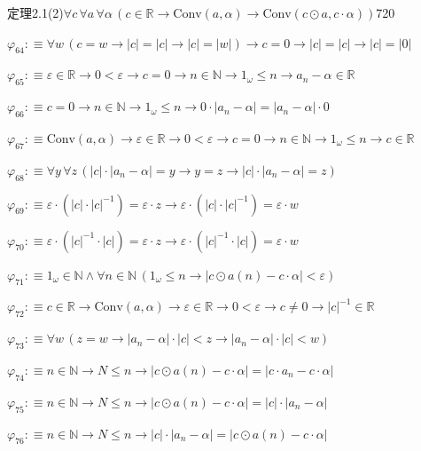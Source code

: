 \begin{fullproof}{定理2.1(2)}{$\forall c\,\forall a\,\forall \alpha\,(c \in \mathbb{R} \to \mathrm{Conv}(a,\alpha) \to \mathrm{Conv}(c \odot a,c \cdot \alpha))$}{720}
\begin{abbrevlist}
\item $\varphi_{64} :\equiv \forall w\,(c = w \to \lvert c \rvert = \lvert c \rvert \to \lvert c \rvert = \lvert w \rvert) \to c = 0 \to \lvert c \rvert = \lvert c \rvert \to \lvert c \rvert = \lvert 0 \rvert$
\item $\varphi_{65} :\equiv \varepsilon \in \mathbb{R} \to 0 < \varepsilon \to c = 0 \to n \in \mathbb{N} \to 1_{\omega} \leq n \to a_{n} - \alpha \in \mathbb{R}$
\item $\varphi_{66} :\equiv c = 0 \to n \in \mathbb{N} \to 1_{\omega} \leq n \to 0 \cdot \lvert a_{n} - \alpha \rvert = \lvert a_{n} - \alpha \rvert \cdot 0$
\item $\varphi_{67} :\equiv \mathrm{Conv}(a,\alpha) \to \varepsilon \in \mathbb{R} \to 0 < \varepsilon \to c = 0 \to n \in \mathbb{N} \to 1_{\omega} \leq n \to c \in \mathbb{R}$
\item $\varphi_{68} :\equiv \forall y\,\forall z\,(\lvert c \rvert \cdot \lvert a_{n} - \alpha \rvert = y \to y = z \to \lvert c \rvert \cdot \lvert a_{n} - \alpha \rvert = z)$
\item $\varphi_{69} :\equiv \varepsilon \cdot (\lvert c \rvert \cdot \lvert c \rvert^{-1}) = \varepsilon \cdot z \to \varepsilon \cdot (\lvert c \rvert \cdot \lvert c \rvert^{-1}) = \varepsilon \cdot w$
\item $\varphi_{70} :\equiv \varepsilon \cdot (\lvert c \rvert^{-1} \cdot \lvert c \rvert) = \varepsilon \cdot z \to \varepsilon \cdot (\lvert c \rvert^{-1} \cdot \lvert c \rvert) = \varepsilon \cdot w$
\item $\varphi_{71} :\equiv 1_{\omega} \in \mathbb{N} \land \forall n \in \mathbb{N}\,(1_{\omega} \leq n \to \lvert c \odot a(n) - c \cdot \alpha \rvert < \varepsilon)$
\item $\varphi_{72} :\equiv c \in \mathbb{R} \to \mathrm{Conv}(a,\alpha) \to \varepsilon \in \mathbb{R} \to 0 < \varepsilon \to c \neq 0 \to \lvert c \rvert^{-1} \in \mathbb{R}$
\item $\varphi_{73} :\equiv \forall w\,(z = w \to \lvert a_{n} - \alpha \rvert \cdot \lvert c \rvert < z \to \lvert a_{n} - \alpha \rvert \cdot \lvert c \rvert < w)$
\item $\varphi_{74} :\equiv n \in \mathbb{N} \to N \leq n \to \lvert c \odot a(n) - c \cdot \alpha \rvert = \lvert c \cdot a_{n} - c \cdot \alpha \rvert$
\item $\varphi_{75} :\equiv n \in \mathbb{N} \to N \leq n \to \lvert c \odot a(n) - c \cdot \alpha \rvert = \lvert c \rvert \cdot \lvert a_{n} - \alpha \rvert$
\item $\varphi_{76} :\equiv n \in \mathbb{N} \to N \leq n \to \lvert c \rvert \cdot \lvert a_{n} - \alpha \rvert = \lvert c \odot a(n) - c \cdot \alpha \rvert$

\end{abbrevlist}
\end{fullproof}
